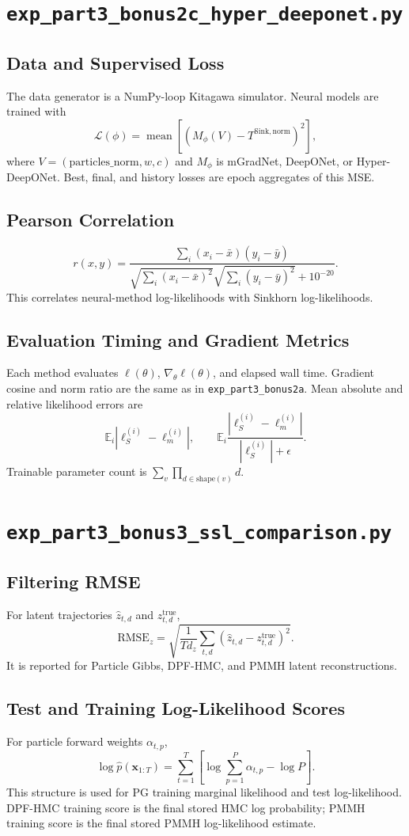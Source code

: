 \documentclass[11pt]{article}
\newcommand{\code}[1]{\texttt{#1}}
\newcommand{\E}{\mathbb{E}}
\newcommand{\RMSE}{\mathrm{RMSE}}
\begin{document}
\section{\code{exp\_part3\_bonus2c\_hyper\_deeponet.py}}
\subsection*{Data and Supervised Loss}
The data generator is a NumPy-loop Kitagawa simulator. Neural models are trained with
\[
\mathcal L(\phi)=\operatorname{mean}\left[(M_\phi(V)-T^{\mathrm{Sink,norm}})^2\right],
\]
where \(V=(\mathrm{particles\_norm},w,c)\) and \(M_\phi\) is mGradNet, DeepONet, or Hyper-DeepONet. Best, final, and history losses are epoch aggregates of this MSE.

\subsection*{Pearson Correlation}
\[
r(x,y)=\frac{\sum_i(x_i-\bar x)(y_i-\bar y)}
{\sqrt{\sum_i(x_i-\bar x)^2}\sqrt{\sum_i(y_i-\bar y)^2}+10^{-20}}.
\]
This correlates neural-method log-likelihoods with Sinkhorn log-likelihoods.

\subsection*{Evaluation Timing and Gradient Metrics}
Each method evaluates \(\ell(\theta)\), \(\nabla_\theta\ell(\theta)\), and elapsed wall time. Gradient cosine and norm ratio are the same as in \code{exp\_part3\_bonus2a}. Mean absolute and relative likelihood errors are
\[
\E_i|\ell_S^{(i)}-\ell_m^{(i)}|,
\qquad
\E_i\frac{|\ell_S^{(i)}-\ell_m^{(i)}|}{|\ell_S^{(i)}|+\epsilon}.
\]
Trainable parameter count is \(\sum_v\prod_{d\in\mathrm{shape}(v)}d\).

\section{\code{exp\_part3\_bonus3\_ssl\_comparison.py}}
\subsection*{Filtering RMSE}
For latent trajectories \(\hat z_{t,d}\) and \(z^{\mathrm{true}}_{t,d}\),
\[
\RMSE_z=\sqrt{\frac{1}{Td_z}\sum_{t,d}(\hat z_{t,d}-z^{\mathrm{true}}_{t,d})^2}.
\]
It is reported for Particle Gibbs, DPF-HMC, and PMMH latent reconstructions.

\subsection*{Test and Training Log-Likelihood Scores}
For particle forward weights \(\alpha_{t,p}\),
\[
\log\hat p(\bm x_{1:T})
=\sum_{t=1}^{T}\left[
\log\sum_{p=1}^{P}\alpha_{t,p}-\log P
\right].
\]
This structure is used for PG training marginal likelihood and test log-likelihood. DPF-HMC training score is the final stored HMC log probability; PMMH training score is the final stored PMMH log-likelihood estimate.
\end{document}

